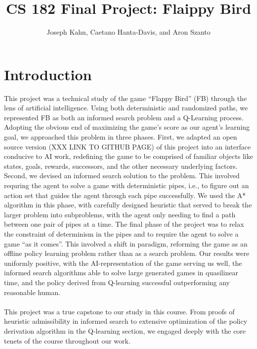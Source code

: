 \documentclass[11pt]{article}
\title{CS 182 Final Project: Flaippy Bird}
\author{Joseph Kahn, Caetano Hanta-Davis, and Aron Szanto}
\begin{document}
\maketitle{}


\section{Introduction}


This project was a technical study of the game ``Flappy Bird'' (FB) through the lens
of artificial intelligence. Using both deterministic and randomized paths,
we represented FB as both an informed search problem and a Q-Learning process.
Adopting the obvious end of maximizing the game's score as our agent's learning goal,
we approached this problem in three phases. First, we adapted an open source version (XXX LINK TO GITHUB PAGE)
of this project into an interface conducive to AI work, redefining the game to be
comprised of familiar objects like states, goals, rewards, successors, and the other
necessary underlying factors. Second, we devised an informed search solution to the problem.
This involved requring the agent to solve a game with deterministic pipes, i.e.,
to figure out an action set that guides the agent through each pipe successfully.
We used the A* algorithm in this phase, with carefully designed heuristic that
served to break the larger problem into subproblems, with the agent only needing
to find a path between one pair of pipes at a time. The final phase of the project
was to relax the constraint of determinism in the pipes and to require the agent
to solve a game ``as it comes''. This involved a shift in paradigm, reforming
the game as an offline policy learning problem rather than as a search problem.
Our results were uniformly positive, with the AI-representation of the game serving
us well, the informed search algorithms able to solve large generated games in
quasilinear time, and the policy derived from Q-learning successful outperforming
any reasonable human.\\\\
This project was a true capstone to our study in this course. From proofs of
heuristic admissibility in informed search to extensive optimization of the policy
derivation algorithm in the Q-learning section, we engaged deeply with the core
tenets of the course throughout our work.
\end{document}
